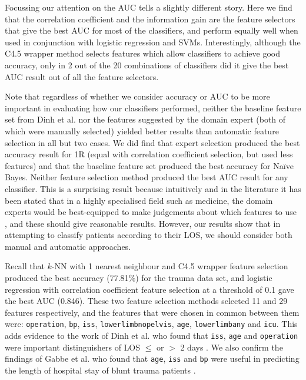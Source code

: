 Focussing our attention on the AUC tells a slightly different story. Here we
find that the correlation coefficient and the information gain are the feature
selectors that give the best AUC for most of the classifiers, and perform
equally well when used in conjunction with logistic regression and SVMs.
Interestingly, although the C4.5
wrapper method selects features which allow classifiers to achieve good
accuracy, only in 2 out of the 20 combinations of classifiers did it give the
best AUC result out of all the feature selectors. 

Note that regardless of whether we consider accuracy or AUC to be more
important in evaluating how our classifiers performed, neither the baseline
feature set from Dinh et al. \cite{Dinh2013a} nor the features suggested by
the domain expert (both of which were manually selected) yielded better
results than automatic feature selection in all but two cases. We did find
that expert selection produced the best accuracy result for 1R (equal with
correlation coefficient selection, but used less features) and that the
baseline feature set produced the best accuracy for Na\"{i}ve Bayes. Neither
feature selection method produced the best AUC result for any classifier.
This is a surprising result because intuitively and in the literature it
has been stated that in a highly specialised field such as medicine, the domain
experts would be best-equipped to make judgements about which features to
use \cite{Witten2005}, and these should give reasonable results. However,
our results show that in attempting to classify patients according to their
LOS, we should consider both manual and automatic approaches.

Recall that $k$-NN with 1 nearest neighbour and C4.5 wrapper feature
selection produced the best accuracy (77.81\%) for the trauma data set, and
logistic regression with correlation coefficient feature selection at a
threshold of 0.1 gave the best AUC (0.846). These two feature selection
methods selected 11 and 29 features respectively, and the features that
were chosen in common between them were: \texttt{operation}, \texttt{bp},
\texttt{iss}, \texttt{lowerlimbnopelvis}, \texttt{age}, \texttt{lowerlimbany}
and \texttt{icu}. This adds evidence to the work of Dinh et al. who found
that \texttt{iss}, \texttt{age} and \texttt{operation} were important
distinguishers of LOS $\leq$ or $>$ 2 days \cite{Dinh2013a}. We also
confirm the findings of Gabbe et al. who found that \texttt{age},
\texttt{iss} and \texttt{bp} were useful in predicting the length of
hospital stay of blunt trauma patients \cite{Gabbe2005}.

